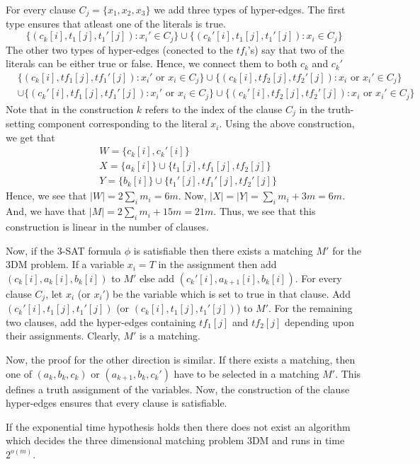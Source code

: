 For every clause $C_j = \{x_1, x_2, x_3\}$ we add three types of hyper-edges.  The first type ensures that atleast one of the literals is true. 
$$\{(c_k[i], t_1[j], t_1'[j]): x_i' \in C_j\} \cup \{(c_k'[i], t_1[j], t_1'[j]): x_i \in C_j\}$$ 
The other two types of hyper-edges (conected to the $tf_i$'s) say that two of the literals can be either true or false. Hence, we connect them to both $c_k$ and $c_k'$
\begin{align*}
  &\{(c_k[i], tf_1[j], tf_1'[j]): x_i' \text{ or }x_i\in C_j\} \cup \{(c_k[i], tf_2[j], tf_2'[j]): x_i \text{ or }x_i' \in C_j\}\\
  &\cup \{(c_k'[i], tf_1[j], tf_1'[j]): x_i' \text{ or }x_i\in C_j\} \cup \{(c_k'[i], tf_2[j], tf_2'[j]): x_i \text{ or }x_i' \in C_j\}
\end{align*}
Note that in the construction $k$ refers to the index of the clause $C_j$ in the truth-setting component corresponding to the literal $x_i$. Using the above construction, we get that
\begin{align*}
  & W = \{c_k[i], c_k'[i]\}\\
  & X = \{a_k[i]\} \cup \{t_1[j], tf_1[j], tf_2[j]\}\\
  & Y = \{b_k[i]\} \cup \{t_1'[j], tf_1'[j], tf_2'[j]\}
\end{align*} 
Hence, we see that $|W| = 2\sum_i m_i = 6m$. Now, $|X| = |Y| = \sum_i m_i + 3m = 6m$. And, we have that $|M| = 2\sum_i m_i + 15m = 21m$. Thus, we see that this construction is linear in the number of clauses. 

Now, if the 3-SAT formula $\phi$ is satisfiable then there exists a matching $M'$ for the 3DM problem. If a variable $x_i = T$ in the assignment then add $(c_k[i], a_k[i], b_k[i])$ to $M'$ else add $(c_k'[i], a_{k+1}[i], b_k[i])$. For every clause $C_j$, let $x_i$ (or $x_i'$) be the variable which is set to true in that clause. Add $(c_k'[i], t_1[j], t_1'[j])$  (or $(c_k[i], t_1[j], t_1'[j])$) to $M'$. For the remaining two clauses, add the hyper-edges containing $tf_1[j]$ and $tf_2[j]$ depending upon their assignments. Clearly, $M'$ is a matching. 

Now, the proof for the other direction is similar. If there exists a matching, then one of $(a_k, b_k, c_k)$ or $(a_{k+1}, b_k, c_k')$ have to be selected in a matching $M'$. This defines a truth assignment of the variables. Now, the construction of the clause hyper-edges ensures that every clause is satisfiable.

\begin{theorem}
If the exponential time hypothesis holds then there does not exist an algorithm which decides the three dimensional matching problem 3DM and runs in time $2^{o(m)}$.
\end{theorem}

